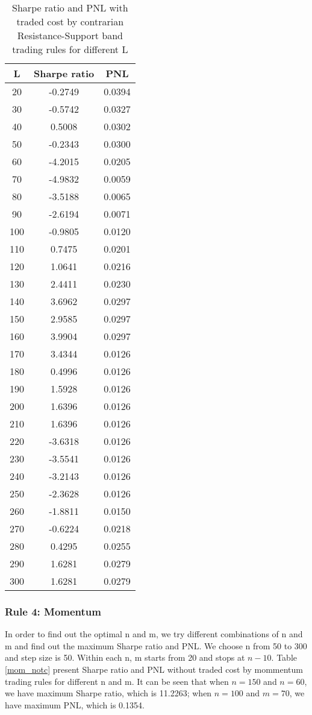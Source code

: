 \documentclass[11pt]{article}
\begin{document}
\begin{table}[ht]
\centering
\begin{tabular}{ccc}
  \hline
L & Sharpe ratio & PNL \\ 
  \hline
   20 & -0.2749 & 0.0394 \\ 
     30 & -0.5742 & 0.0327 \\ 
     40 & 0.5008 & 0.0302 \\ 
     50 & -0.2343 & 0.0300 \\ 
     60 & -4.2015 & 0.0205 \\ 
     70 & -4.9832 & 0.0059 \\ 
     80 & -3.5188 & 0.0065 \\ 
     90 & -2.6194 & 0.0071 \\ 
    100 & -0.9805 & 0.0120 \\ 
    110 & 0.7475 & 0.0201 \\ 
    120 & 1.0641 & 0.0216 \\ 
    130 & 2.4411 & 0.0230 \\ 
    140 & 3.6962 & 0.0297 \\ 
    150 & 2.9585 & 0.0297 \\ 
    160 & 3.9904 & 0.0297 \\ 
    170 & 3.4344 & 0.0126 \\ 
    180 & 0.4996 & 0.0126 \\ 
    190 & 1.5928 & 0.0126 \\ 
    200 & 1.6396 & 0.0126 \\ 
    210 & 1.6396 & 0.0126 \\ 
    220 & -3.6318 & 0.0126 \\ 
    230 & -3.5541 & 0.0126 \\ 
    240 & -3.2143 & 0.0126 \\ 
    250 & -2.3628 & 0.0126 \\ 
    260 & -1.8811 & 0.0150 \\ 
    270 & -0.6224 & 0.0218 \\ 
    280 & 0.4295 & 0.0255 \\ 
    290 & 1.6281 & 0.0279 \\ 
    300 & 1.6281 & 0.0279 \\ 
   \hline
\end{tabular}
\caption{Sharpe ratio and PNL with traded cost by contrarian Resistance-Support band trading rules for different L}\label{RS_tc_con}
\end{table}

\subsubsection{Rule 4: Momentum}
In order to find out the optimal n and m, we try different combinations of n and m and find out the maximum Sharpe ratio and PNL. We choose n from 50 to 300 and step size is 50. Within each n, m starts from 20 and stops at $n-10$. Table \ref{mom_notc} present Sharpe ratio and PNL without traded cost by mommentum trading rules for different n and m. It can be seen that when $n=150$ and $n=60$, we have maximum Sharpe ratio, which is 11.2263; when $n=100$ and $m=70$, we have maximum PNL, which is 0.1354.
\end{document}
